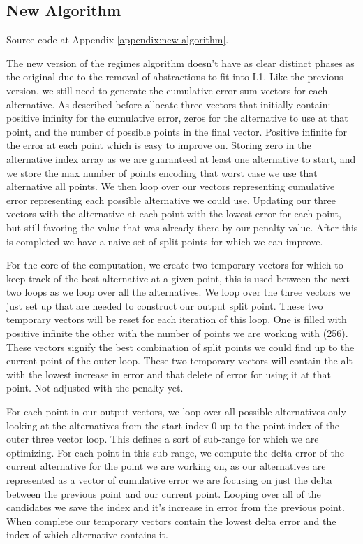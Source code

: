 \documentclass{article}
\begin{document}
\subsection{New Algorithm}

Source code at Appendix \ref{appendix:new-algorithm}.

The new version of the regimes algorithm doesn’t have as clear distinct phases as the original due to the removal of abstractions to fit into L1. Like the previous version, we still need to generate the cumulative error sum vectors for each alternative. As described before allocate three vectors that initially contain: positive infinity for the cumulative error, zeros for the alternative to use at that point, and the number of possible points in the final vector. Positive infinite for the error at each point which is easy to improve on. Storing zero in the alternative index array as we are guaranteed at least one alternative to start, and we store the max number of points encoding that worst case we use that alternative all points. We then loop over our vectors representing cumulative error representing each possible alternative we could use. Updating our three vectors with the alternative at each point with the lowest error for each point, but still favoring the value that was already there by our penalty value. After this is completed we have a naive set of split points for which we can improve.

For the core of the computation, we create two temporary vectors for which to keep track of the best alternative at a given point, this is used between the next two loops as we loop over all the alternatives. We loop over the three vectors we just set up that are needed to construct our output split point. These two temporary vectors will be reset for each iteration of this loop. One is filled with positive infinite the other with the number of points we are working with (256). These vectors signify the best combination of split points we could find up to the current point of the outer loop. These two temporary vectors will contain the alt with the lowest increase in error and that delete of error for using it at that point. Not adjusted with the penalty yet.

For each point in our output vectors, we loop over all possible alternatives only looking at the alternatives from the start index 0 up to the point index of the outer three vector loop. This defines a sort of sub-range for which we are optimizing. For each point in this sub-range, we compute the delta error of the current alternative for the point we are working on, as our alternatives are represented as a vector of cumulative error we are focusing on just the delta between the previous point and our current point. Looping over all of the candidates we save the index and it's increase in error from the previous point. When complete our temporary vectors contain the lowest delta error and the index of which alternative contains it.
\end{document}
